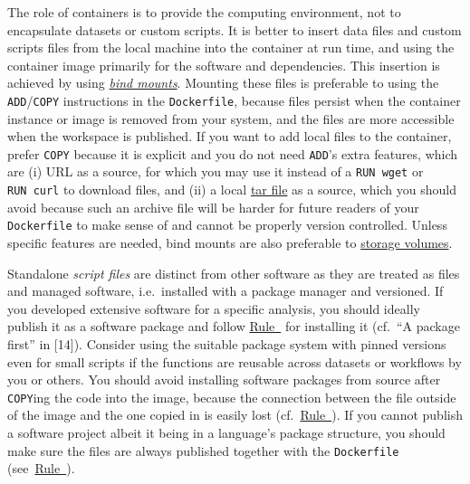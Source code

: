\documentclass[10pt,letterpaper]{article}
\begin{document}
  \label{rule:mount} 

The role of containers is to provide the computing environment, not to
encapsulate datasets or custom scripts. It is better to insert data
files and custom scripts files from the local machine into the container
at run time, and using the container image primarily for the software
and dependencies. This insertion is achieved by using
\href{https://docs.docker.com/storage/bind-mounts/}{\emph{bind mounts}}.
Mounting these files is preferable to using the
\texttt{ADD}/\texttt{COPY} instructions in the \texttt{Dockerfile},
because files persist when the container instance or image is removed
from your system, and the files are more accessible when the workspace
is published. If you want to add local files to the container, prefer
\texttt{COPY} because it is explicit and you do not need \texttt{ADD}'s
extra features, which are (i) URL as a source, for which you may use it
instead of a \texttt{RUN\ wget} or \texttt{RUN\ curl} to download files,
and (ii) a local
\href{https://en.wikipedia.org/wiki/Tar_(computing)}{tar file} as a
source, which you should avoid because such an archive file will be
harder for future readers of your \texttt{Dockerfile} to make sense of
and cannot be properly version controlled. Unless specific features are
needed, bind mounts are also preferable to
\href{https://docs.docker.com/storage/volumes/}{storage volumes}.

Standalone \emph{script files} are distinct from other software as they
are treated as files and managed software, i.e.~installed with a package
manager and versioned. If you developed extensive software for a
specific analysis, you should ideally publish it as a software package
and follow \hyperref[{rule:pinning}]{Rule~} for
installing it (cf.~``A package first'' in {[}14{]}). Consider using the
suitable package system with pinned versions even for small scripts if
the functions are reusable across datasets or workflows by you or
others. You should avoid installing software packages from source after
\texttt{COPY}ing the code into the image, because the connection between
the file outside of the image and the one copied in is easily lost
(cf.~\hyperref[{rule:mount}]{Rule~}). If you
cannot publish a software project albeit it being in a language's
package structure, you should make sure the files are always published
together with the \texttt{Dockerfile}
(see~\hyperref[{rule:publish}]{Rule~}).
\end{document}
